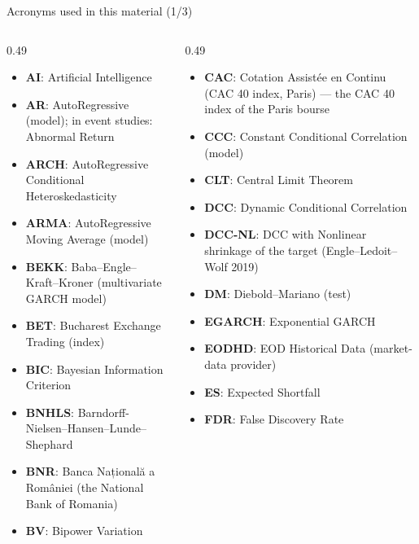 
{
\begin{frame}[noframenumbering]
    \titlepage
\end{frame}
}
\begin{frame}{Acronyms used in this material (1/3)}
\begin{columns}[T]
\begin{column}{0.49\textwidth}
\begin{itemize}\setlength{\itemsep}{0pt}
    \item \textbf{AI}: Artificial Intelligence
    \item \textbf{AR}: AutoRegressive (model); in event studies: Abnormal Return
    \item \textbf{ARCH}: AutoRegressive Conditional Heteroskedasticity
    \item \textbf{ARMA}: AutoRegressive Moving Average (model)
    \item \textbf{BEKK}: Baba–Engle–Kraft–Kroner (multivariate GARCH model)
    \item \textbf{BET}: Bucharest Exchange Trading (index)
    \item \textbf{BIC}: Bayesian Information Criterion
    \item \textbf{BNHLS}: Barndorff-Nielsen–Hansen–Lunde–Shephard
    \item \textbf{BNR}: Banca Națională a României (the National Bank of Romania)
    \item \textbf{BV}: Bipower Variation
\end{itemize}
\end{column}
\begin{column}{0.49\textwidth}
\begin{itemize}\setlength{\itemsep}{0pt}
    \item \textbf{CAC}: Cotation Assistée en Continu (CAC 40 index, Paris) — the CAC 40 index of the Paris bourse
    \item \textbf{CCC}: Constant Conditional Correlation (model)
    \item \textbf{CLT}: Central Limit Theorem
    \item \textbf{DCC}: Dynamic Conditional Correlation
    \item \textbf{DCC-NL}: DCC with Nonlinear shrinkage of the target (Engle–Ledoit–Wolf 2019)
    \item \textbf{DM}: Diebold–Mariano (test)
    \item \textbf{EGARCH}: Exponential GARCH
    \item \textbf{EODHD}: EOD Historical Data (market-data provider)
    \item \textbf{ES}: Expected Shortfall
    \item \textbf{FDR}: False Discovery Rate
\end{itemize}
\end{column}
\end{columns}
\end{frame}
